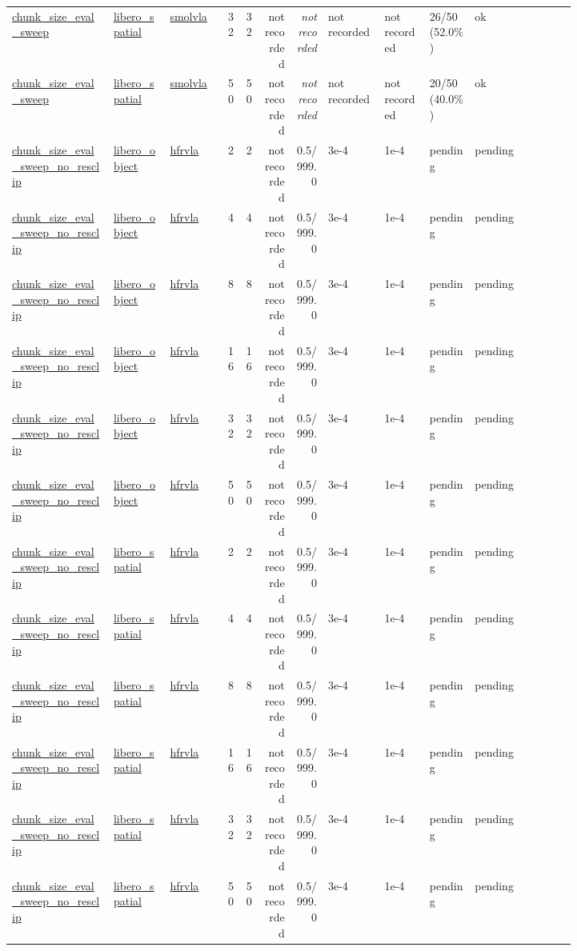 \begin{tiny}
\begin{longtable}{@{}p{0.18\linewidth}p{0.10\linewidth}p{0.10\linewidth}rrrrp{0.10\linewidth}p{0.08\linewidth}p{0.08\linewidth}p{0.11\linewidth}p{0.07\linewidth}@{}}
\url{chunk_size_eval_sweep} & \url{libero_spatial} & \url{smolvla} & 32 & 32 & not recorded & \emph{not recorded} & not recorded & not recorded & 26/50 (52.0\%) & ok \\
\url{chunk_size_eval_sweep} & \url{libero_spatial} & \url{smolvla} & 50 & 50 & not recorded & \emph{not recorded} & not recorded & not recorded & 20/50 (40.0\%) & ok \\
\url{chunk_size_eval_sweep_no_resclip} & \url{libero_object} & \url{hfrvla} & 2 & 2 & not recorded & 0.5/999.0 & 3e-4 & 1e-4 & pending & pending \\
\url{chunk_size_eval_sweep_no_resclip} & \url{libero_object} & \url{hfrvla} & 4 & 4 & not recorded & 0.5/999.0 & 3e-4 & 1e-4 & pending & pending \\
\url{chunk_size_eval_sweep_no_resclip} & \url{libero_object} & \url{hfrvla} & 8 & 8 & not recorded & 0.5/999.0 & 3e-4 & 1e-4 & pending & pending \\
\url{chunk_size_eval_sweep_no_resclip} & \url{libero_object} & \url{hfrvla} & 16 & 16 & not recorded & 0.5/999.0 & 3e-4 & 1e-4 & pending & pending \\
\url{chunk_size_eval_sweep_no_resclip} & \url{libero_object} & \url{hfrvla} & 32 & 32 & not recorded & 0.5/999.0 & 3e-4 & 1e-4 & pending & pending \\
\url{chunk_size_eval_sweep_no_resclip} & \url{libero_object} & \url{hfrvla} & 50 & 50 & not recorded & 0.5/999.0 & 3e-4 & 1e-4 & pending & pending \\
\url{chunk_size_eval_sweep_no_resclip} & \url{libero_spatial} & \url{hfrvla} & 2 & 2 & not recorded & 0.5/999.0 & 3e-4 & 1e-4 & pending & pending \\
\url{chunk_size_eval_sweep_no_resclip} & \url{libero_spatial} & \url{hfrvla} & 4 & 4 & not recorded & 0.5/999.0 & 3e-4 & 1e-4 & pending & pending \\
\url{chunk_size_eval_sweep_no_resclip} & \url{libero_spatial} & \url{hfrvla} & 8 & 8 & not recorded & 0.5/999.0 & 3e-4 & 1e-4 & pending & pending \\
\url{chunk_size_eval_sweep_no_resclip} & \url{libero_spatial} & \url{hfrvla} & 16 & 16 & not recorded & 0.5/999.0 & 3e-4 & 1e-4 & pending & pending \\
\url{chunk_size_eval_sweep_no_resclip} & \url{libero_spatial} & \url{hfrvla} & 32 & 32 & not recorded & 0.5/999.0 & 3e-4 & 1e-4 & pending & pending \\
\url{chunk_size_eval_sweep_no_resclip} & \url{libero_spatial} & \url{hfrvla} & 50 & 50 & not recorded & 0.5/999.0 & 3e-4 & 1e-4 & pending & pending \\

\end{longtable}
\end{tiny}
